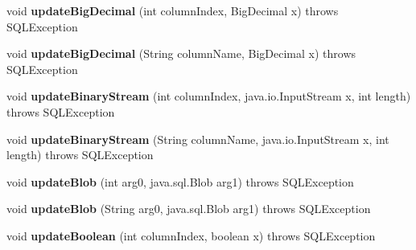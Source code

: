 \begin{DoxyCompactItemize}
void {\bfseries update\+Big\+Decimal} (int column\+Index, Big\+Decimal x)  throws S\+Q\+L\+Exception 
\item 
\mbox{\label{classcom_1_1mysql_1_1cj_1_1jdbc_1_1result_1_1_result_set_impl_a798d8c01a0245b30e5a931fde57b8e66}} 
void {\bfseries update\+Big\+Decimal} (String column\+Name, Big\+Decimal x)  throws S\+Q\+L\+Exception 
\item 
\mbox{\label{classcom_1_1mysql_1_1cj_1_1jdbc_1_1result_1_1_result_set_impl_aaa0c12c387b03229f451bcff84539da2}} 
void {\bfseries update\+Binary\+Stream} (int column\+Index, java.\+io.\+Input\+Stream x, int length)  throws S\+Q\+L\+Exception 
\item 
\mbox{\label{classcom_1_1mysql_1_1cj_1_1jdbc_1_1result_1_1_result_set_impl_a85bcf053f7a0d99dc9d15955962e348f}} 
void {\bfseries update\+Binary\+Stream} (String column\+Name, java.\+io.\+Input\+Stream x, int length)  throws S\+Q\+L\+Exception 
\item 
\mbox{\label{classcom_1_1mysql_1_1cj_1_1jdbc_1_1result_1_1_result_set_impl_a68f9605f3afef0c5c478686f602b1e9a}} 
void {\bfseries update\+Blob} (int arg0, java.\+sql.\+Blob arg1)  throws S\+Q\+L\+Exception 
\item 
\mbox{\label{classcom_1_1mysql_1_1cj_1_1jdbc_1_1result_1_1_result_set_impl_aa9297e7eb25d40d93d47696ad60a65d2}} 
void {\bfseries update\+Blob} (String arg0, java.\+sql.\+Blob arg1)  throws S\+Q\+L\+Exception 
\item 
\mbox{\label{classcom_1_1mysql_1_1cj_1_1jdbc_1_1result_1_1_result_set_impl_a771a72e5c06a9b65546cfbf374addb5d}} 
void {\bfseries update\+Boolean} (int column\+Index, boolean x)  throws S\+Q\+L\+Exception 
\item 
\mbox{\label{classcom_1_1mysql_1_1cj_1_1jdbc_1_1result_1_1_result_set_impl_ae8c78aad2e4078932d6153efecb2632c}} 

\end{DoxyCompactItemize}
